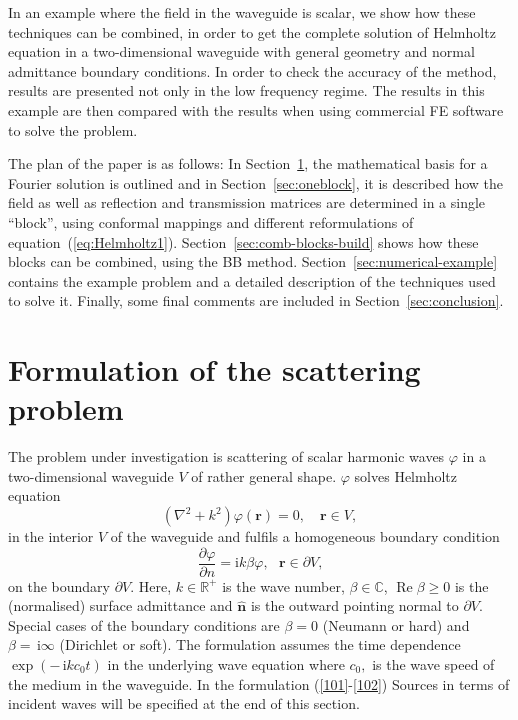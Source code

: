 \documentclass[numreferences]{kluwer}
\renewcommand{\phi}{\varphi}
\renewcommand{\Re}{\operatorname{Re}}
\renewcommand{\i}{\,\mathrm{i}}
\begin{document}
In an example where the field in the waveguide is scalar, we show how
these techniques can be combined, in order to get the complete
solution of Helmholtz equation in a two-dimensional waveguide with
general geometry and normal admittance boundary conditions. In order
to check the accuracy of the method, results are presented not only in
the low frequency regime.  The results in this example are then
compared with the results when using commercial FE software to solve
the problem.

The plan of the paper is as follows: In Section~\ref{sec:prel}, the
mathematical basis for a Fourier solution is outlined and in
Section~\ref{sec:oneblock}, it is described how the field as well as
reflection and transmission matrices are determined in a single
``block'', using conformal mappings and different reformulations of
equation~(\ref{eq:Helmholtz1}).  Section~\ref{sec:comb-blocks-build}
shows how these blocks can be combined, using the BB
method. Section~\ref{sec:numerical-example} contains the example
problem and a detailed description of the techniques used to solve
it. Finally, some final comments are included in
Section~\ref{sec:conclusion}.

\section{Formulation of the scattering problem}
\label{sec:prel}


The problem under investigation is scattering of scalar harmonic waves
$\phi$ in a two-dimensional waveguide $V$ of rather general
shape. $\phi$ solves Helmholtz equation%
\begin{equation}
  (\nabla^{2}+k^{2})\phi(\bm{r})=0,\quad\bm{r}\in V, \label{101}%
\end{equation}
in the interior $V$ of the waveguide and fulfils a homogeneous
boundary condition%
\begin{equation}
  \dfrac{\partial \phi}{\partial n}=\text{i}k\beta \phi,
  \text{ }\bm{r}\in\partial V\text{,} \label{102}%
\end{equation}
on the boundary $\partial V$. Here, $k\in\mathbb{R}^{+}$ is the wave
number, $\beta\in\mathbb{C}$, $\Re\beta\geq0$ is the (normalised)
surface admittance and $\widehat{\bm{n}}$ is the outward pointing
normal to $\partial V$. Special cases of the boundary conditions are
$\beta=0$ (Neumann or hard) and $\beta=\i\infty$ (Dirichlet or
soft). The formulation assumes the time dependence $\exp(-\i kc_{0}t)$
in the underlying wave equation where $c_{0},$ is the wave speed of
the medium in the waveguide. In the formulation (\ref{101}-\ref{102}) Sources in terms of incident waves will
be specified at the end of this section.
\end{document}

